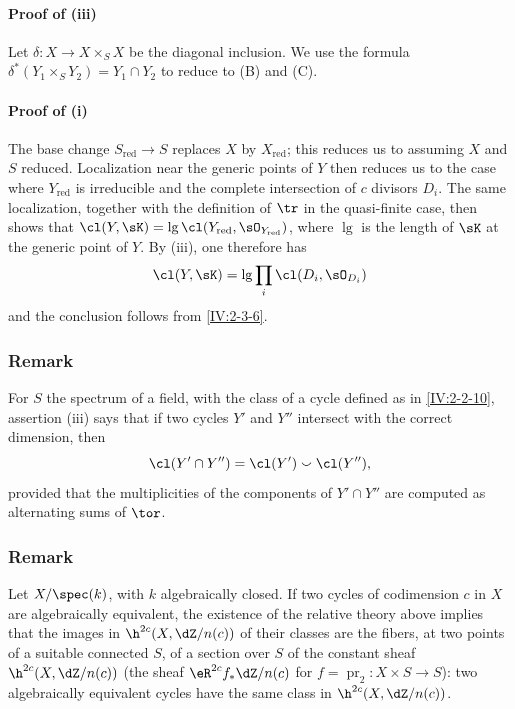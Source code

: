 \documentclass[oneside]{book}
\begin{document}
\paragraph{Proof of (iii)}
Let $\delta:X\to X\times_S X$ be the diagonal inclusion. We use the formula
$\delta^\ast(Y_1\times_S Y_2) = Y_1\cap Y_2$ to reduce to (B) and (C).

\paragraph{Proof of (i)}
The base change $S_\text{red}\to S$ replaces $X$ by $X_\text{red}$; this
reduces us to assuming $X$ and $S$ reduced. Localization near the generic
points of $Y$ then reduces us to the case where $Y_\text{red}$ is irreducible
and the complete intersection of $c$ divisors $D_i$. The same localization,
together with the definition of $\tr$ in the quasi-finite case, then shows
that
$\cl(Y,\sK)=\operatorname{lg}\cl(Y_\text{red},\sO_{Y_\text{red}})$, where
$\operatorname{lg}$ is the length of $\sK$ at the generic point of $Y$.
By (iii), one therefore has
\[
  \cl(Y,\sK) = \operatorname{lg} \prod_i \cl(D_i,\sO_{D_i})
\]
and the conclusion follows from \ref{IV:2-3-6}.






\subsubsection{Remark}\label{IV:2-3-9}

For $S$ the spectrum of a field, with the class of a cycle defined as in
\ref{IV:2-2-10}, assertion (iii) says that if two cycles $Y'$ and $Y''$
intersect with the correct dimension, then
\[
  \cl(Y'\cap Y'') = \cl(Y')\smallsmile \cl(Y'')\text{,}
\]
provided that the multiplicities of the components of $Y'\cap Y''$ are
computed as alternating sums of $\tor$.






\subsubsection{Remark}\label{IV:2-3-10}

Let $X/\spec(k)$, with $k$ algebraically closed. If two cycles of codimension
$c$ in $X$ are algebraically equivalent, the existence of the relative
theory above implies that the images in $\h^{2 c}(X,\dZ/n(c))$ of their
classes are the fibers, at two points of a suitable connected $S$, of a
section over $S$ of the constant sheaf $\h^{2 c}(X,\dZ/n(c))$ (the sheaf
$\eR^{2 c} f_\ast \dZ/n(c)$ for
$f=\operatorname{pr}_2:X\times S\to S$): two algebraically equivalent cycles
have the same class in $\h^{2 c}(X,\dZ/n(c))$.
\end{document}
